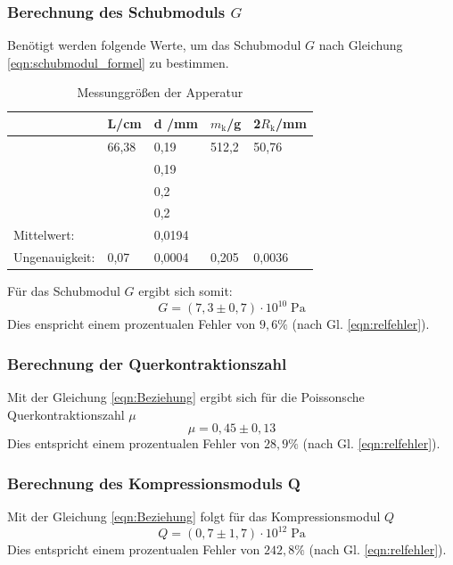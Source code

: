 \newpage
\subsubsection{Berechnung des Schubmoduls $G$}
Benötigt werden folgende Werte, um das Schubmodul $G$ nach Gleichung \ref{eqn:schubmodul_formel}
zu bestimmen.
\begin{table}
    \centering
    \label{tab:tabelle_1}
    \begin{tabular}{p{3cm} | p{1.5cm} | p{1.5cm} | p{1.5cm} | p{1.5cm}}
    \toprule
    & L\;/\;cm & d \;/\;mm & $m_\text{k}$\;/\;g & 2$R_\text{k}$\;/\;mm\\
    \midrule
    & 66,38 & 0,19 & 512,2 &  50,76 \\
    &      & 0,19 &       &        \\    
    &      & 0,2  &       &        \\
    &      & 0,2  &       &        \\
    \midrule
    Mittelwert:    &      & 0,0194 &       &        \\
    Ungenauigkeit: & 0,07 & 0,0004 & 0,205 & 0,0036 \\
    \bottomrule
    \end{tabular}
    \caption{Messunggrößen der Apperatur}
    \label{tab:tabelle_2}
\end{table}

Für das Schubmodul $G$ ergibt sich somit:
\begin{equation*}
    G = (7,3 \pm 0,7 )\cdot 10^{10}\;\mathrm{Pa}
\end{equation*}
Dies enspricht einem prozentualen Fehler von $9,6\%$ (nach Gl. \ref{eqn:relfehler}).

\subsubsection{Berechnung der Querkontraktionszahl}
Mit der Gleichung \ref{eqn:Beziehung} ergibt sich für die Poissonsche Querkontraktionszahl $\mu$
\begin{equation*}
    \mu = 0,45 \pm 0,13 %
\end{equation*}
Dies entspricht einem prozentualen Fehler von $28,9\%$ (nach Gl. \ref{eqn:relfehler}).

\subsubsection{Berechnung des Kompressionsmoduls Q}
Mit der Gleichung \ref{eqn:Beziehung} 
folgt für das Kompressionsmodul $Q$
\begin{equation*}
    Q = (0,7 \pm 1,7) \cdot 10^{12} \;\mathrm{Pa}
\end{equation*}
Dies entspricht einem prozentualen Fehler von $242,8\%$ (nach Gl. \ref{eqn:relfehler}).\\

